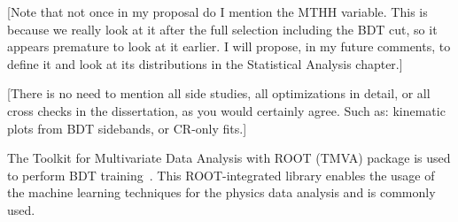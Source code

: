            [Note that not once in my proposal do I mention the MTHH variable. This is because we really  look
          at it after  the full selection including the BDT cut, so it appears premature to look at it earlier.
          I will propose, in my future comments, to define it and look at its distributions in the Statistical Analysis chapter.]

           [There is no need to mention all side studies, all optimizations in detail, or all cross checks in 
          the dissertation, as you would certainly agree. Such as: kinematic plots from BDT sidebands,
          or CR-only fits.]
          
          
The Toolkit for Multivariate Data Analysis with ROOT (TMVA) package is used to perform BDT training~\cite{Hocker:2007ht}. This ROOT-integrated library enables the usage of the machine learning techniques for the physics data analysis and is commonly used. 


